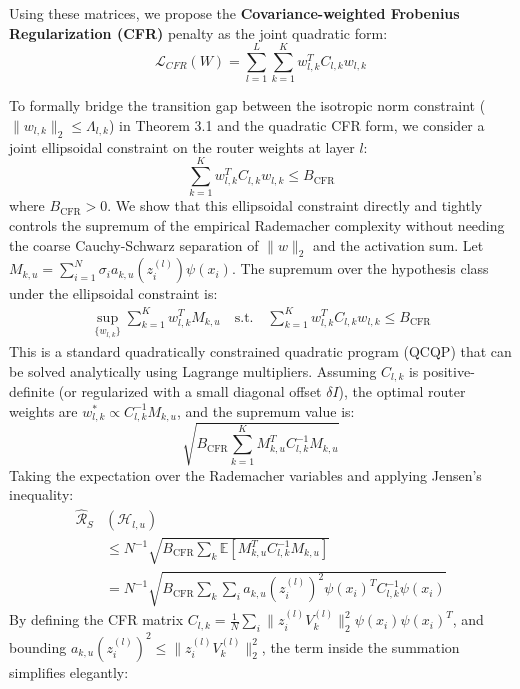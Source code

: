 Using these matrices, we propose the \textbf{Covariance-weighted Frobenius Regularization (CFR)} penalty as the joint quadratic form:
\begin{equation}
    \mathcal{L}_{CFR}(W) = \sum_{l=1}^L \sum_{k=1}^K w_{l, k}^T C_{l, k} w_{l, k}
\end{equation}

To formally bridge the transition gap between the isotropic norm constraint ($\|w_{l, k}\|_2 \leq \Lambda_{l, k}$) in Theorem 3.1 and the quadratic CFR form, we consider a joint ellipsoidal constraint on the router weights at layer $l$:
\begin{equation}
    \sum_{k=1}^K w_{l, k}^T C_{l, k} w_{l, k} \leq B_{\text{CFR}}
\end{equation}
where $B_{\text{CFR}} > 0$. We show that this ellipsoidal constraint directly and tightly controls the supremum of the empirical Rademacher complexity without needing the coarse Cauchy-Schwarz separation of $\|w\|_2$ and the activation sum. Let $M_{k, u} = \sum_{i=1}^N \sigma_i a_{k, u}(z_i^{(l)}) \psi(x_i)$. The supremum over the hypothesis class under the ellipsoidal constraint is:
\begin{align}
    \sup_{\{w_{l, k}\}} \sum_{k=1}^K w_{l, k}^T M_{k, u} \quad \text{s.t.} \quad \sum_{k=1}^K w_{l, k}^T C_{l, k} w_{l, k} \leq B_{\text{CFR}}
\end{align}
This is a standard quadratically constrained quadratic program (QCQP) that can be solved analytically using Lagrange multipliers. Assuming $C_{l, k}$ is positive-definite (or regularized with a small diagonal offset $\delta I$), the optimal router weights are $w_{l, k}^* \propto C_{l, k}^{-1} M_{k, u}$, and the supremum value is:
\begin{equation}
    \sqrt{ B_{\text{CFR}} \sum_{k=1}^K M_{k, u}^T C_{l, k}^{-1} M_{k, u} }
\end{equation}
Taking the expectation over the Rademacher variables and applying Jensen's inequality:
\begin{align}
    \hat{\mathcal{R}}_S&(\mathcal{H}_{l, u}) \nonumber \\
    &\leq N^{-1} \sqrt{ B_{\text{CFR}} \sum_k \mathbb{E} [ M_{k, u}^T C_{l, k}^{-1} M_{k, u} ] } \nonumber \\
    &= N^{-1} \sqrt{ B_{\text{CFR}} \sum_k \sum_i a_{k, u}(z_i^{(l)})^2 \psi(x_i)^T C_{l, k}^{-1} \psi(x_i) }
\end{align}
By defining the CFR matrix $C_{l, k} = \frac{1}{N} \sum_i \|z_i^{(l)} V_k^{(l)}\|_2^2 \psi(x_i)\psi(x_i)^T$, and bounding $a_{k, u}(z_i^{(l)})^2 \leq \|z_i^{(l)} V_k^{(l)}\|_2^2$, the term inside the summation simplifies elegantly:
